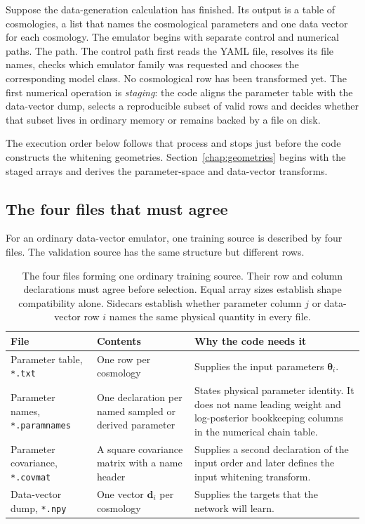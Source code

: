 \documentclass[10pt,aps,prd,twocolumn,nofootinbib]{revtex4-2}
\newcommand{\code}[1]{\texttt{#1}}
\newcommand{\btheta}{\boldsymbol{\theta}}
\newcommand{\bd}{\mathbf{d}}
\begin{document}
Suppose the data-generation calculation has finished.  Its output is a table of
cosmologies, a list that names the cosmological parameters and one data
vector for each cosmology.  The emulator begins with separate control and
numerical paths.  The
path.  The control path first reads the YAML file, resolves its file names,
checks which emulator family was requested and chooses the corresponding
model class.  No cosmological row has been transformed yet.  The first
numerical operation is \emph{staging}: the code aligns the parameter table
with the data-vector dump, selects a reproducible subset of valid rows and
decides whether that subset lives in ordinary memory or remains backed by a
file on disk.

The execution order below follows that process and stops just before
the code constructs the whitening geometries.  Section~\ref{chap:geometries} begins with the
staged arrays and derives the parameter-space and data-vector transforms.

\subsection{The four files that must agree}

For an ordinary data-vector emulator, one training source is described by
four files.  The validation source has the same structure but different
rows.

\begin{table}[t]
\centering
\begin{tabular}{p{}p{}p{}}
\toprule
File & Contents & Why the code needs it \\
\midrule
Parameter table, \code{*.txt}
  & One row per cosmology
  & Supplies the input parameters $\btheta_i$.  \\
Parameter names, \code{*.paramnames}
  & One declaration per named sampled or derived parameter
  & States physical parameter identity.  It does not name leading weight and
    log-posterior bookkeeping columns in the numerical chain table.  \\
Parameter covariance, \code{*.covmat}
  & A square covariance matrix with a name header
  & Supplies a second declaration of the input order and later defines the
    input whitening transform.  \\
Data-vector dump, \code{*.npy}
  & One vector $\bd_i$ per cosmology
  & Supplies the targets that the network will learn.  \\
\bottomrule
\end{tabular}
\caption{The four files forming one ordinary training source.  Their row and
column declarations must agree before selection.  Equal array sizes establish
shape compatibility alone.  Sidecars establish whether parameter column $j$ or
data-vector row $i$ names the same physical quantity in every file.}
\label{tab:source-files}
\end{table}
\end{document}
